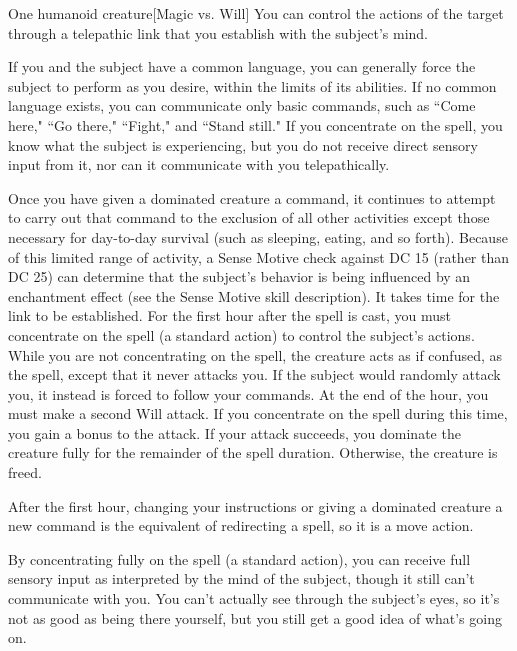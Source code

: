\spellrng{\rngmed}
\begin{spelltarget}{One humanoid creature}[Magic vs. Will]
    \spellsuccess You can control the actions of the target through a telepathic link that you establish with the subject's mind.
    \par If you and the subject have a common language, you can generally force the subject to perform as you desire, within the limits of its abilities. If no common language exists, you can communicate only basic commands, such as ``Come here," ``Go there," ``Fight," and ``Stand still." If you concentrate on the spell, you know what the subject is experiencing, but you do not receive direct sensory input from it, nor can it communicate with you telepathically.
    \par Once you have given a dominated creature a command, it continues to attempt to carry out that command to the exclusion of all other activities except those necessary for day-to-day survival (such as sleeping, eating, and so forth). Because of this limited range of activity, a Sense Motive check against DC 15 (rather than DC 25) can determine that the subject's behavior is being influenced by an enchantment effect (see the Sense Motive skill description).
    It takes time for the link to be established. For the first hour after the spell is cast, you must concentrate on the spell (a standard action) to control the subject's actions. While you are not concentrating on the spell, the creature acts as if confused, as the  spell, except that it never attacks you. If the subject would randomly attack you, it instead is forced to follow your commands. At the end of the hour, you must make a second Will attack. If you concentrate on the spell during this time, you gain a  bonus to the attack. If your attack succeeds, you dominate the creature fully for the remainder of the spell duration. Otherwise, the creature is freed.
    \par After the first hour, changing your instructions or giving a dominated creature a new command is the equivalent of redirecting a spell, so it is a move action.
    \par By concentrating fully on the spell (a standard action), you can receive full sensory input as interpreted by the mind of the subject, though it still can't communicate with you. You can't actually see through the subject's eyes, so it's not as good as being there yourself, but you still get a good idea of what's going on.

\end{spelltarget}
